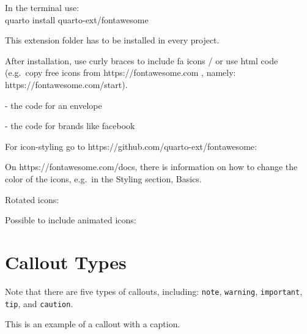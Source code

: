 \documentclass[
  letterpaper,
]{scrbook}
\begin{document}
In the terminal use:\\
quarto install quarto-ext/fontawesome

This extension folder has to be installed in every project.

After installation, use curly braces to include fa icons / or use html
code (e.g.~copy free icons from https://fontawesome.com , namely:
https://fontawesome.com/start).

 - the code for an envelope

 - the code for brands like facebook

For icon-styling go to https://github.com/quarto-ext/fontawesome:


On https://fontawesome.com/docs, there is information on how to change
the color of the icons, e.g.~in the Styling section, Basics.

{ }

Rotated icons:

Possible to include animated icons:

\hypertarget{callout-types}{%
\section{Callout Types}\label{callout-types}}

\begin{tcolorbox}[enhanced jigsaw, breakable, colbacktitle=quarto-callout-note-color!10!white, coltitle=black, colframe=quarto-callout-note-color-frame, bottomrule=.15mm, title=\textcolor{quarto-callout-note-color}{\faInfo}\hspace{0.5em}{Note}, colback=white, leftrule=.75mm, arc=.35mm, bottomtitle=1mm, toptitle=1mm, opacityback=0, titlerule=0mm, rightrule=.15mm, toprule=.15mm, left=2mm, opacitybacktitle=0.6]

Note that there are five types of callouts, including: \texttt{note},
\texttt{warning}, \texttt{important}, \texttt{tip}, and
\texttt{caution}.

\end{tcolorbox}

\begin{tcolorbox}[enhanced jigsaw, breakable, colbacktitle=quarto-callout-tip-color!10!white, coltitle=black, colframe=quarto-callout-tip-color-frame, bottomrule=.15mm, title=\textcolor{quarto-callout-tip-color}{\faLightbulb}\hspace{0.5em}{Tip With Caption / Tipp mit Titel}, colback=white, leftrule=.75mm, arc=.35mm, bottomtitle=1mm, toptitle=1mm, opacityback=0, titlerule=0mm, rightrule=.15mm, toprule=.15mm, left=2mm, opacitybacktitle=0.6]

This is an example of a callout with a caption.

\end{tcolorbox}
\end{document}
